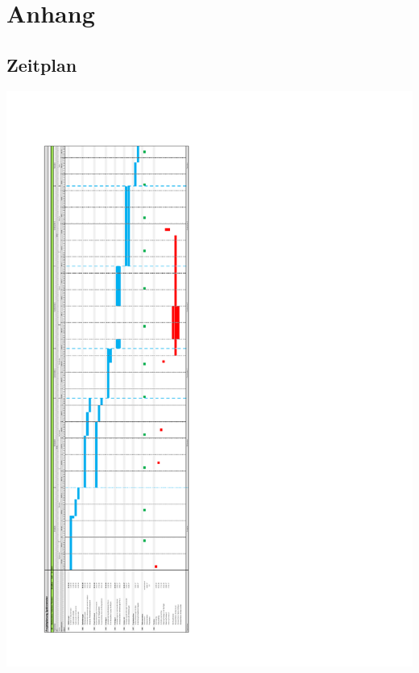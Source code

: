 \chapter{Anhang}
\section{Zeitplan}
\includegraphics[scale= 0.75]{resources/Projektplanung_Spektrometer}
